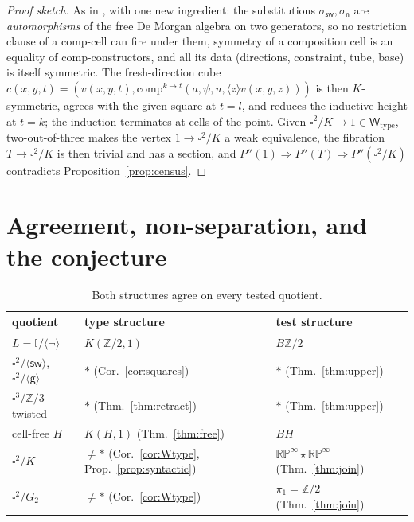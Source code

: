 \documentclass[11pt]{amsart}
\theoremstyle{definition}
\newcommand{\I}{\mathbb{I}}
\newcommand{\Wtype}{\mathsf{W}_{\mathrm{type}}}
\newcommand{\sw}{\mathsf{sw}}
\newcommand{\nb}{\mathsf{n}}
\newcommand{\gtw}{\mathsf{g}}
\newcommand{\Kl}{K}
\begin{document}
\begin{proof}[Proof sketch]
  As in \cite[Prop.~4.3]{PaperK}, with one new ingredient: the
  substitutions $\sigma_{\sw}, \sigma_{\nb}$ are
  \emph{automorphisms} of the free De Morgan algebra on two
  generators, so no restriction clause of a $\mathrm{comp}$-cell
  can fire under them, symmetry of a composition cell is an
  equality of $\mathrm{comp}$-constructors, and all its data
  (directions, constraint, tube, base) is itself symmetric.  The
  fresh-direction cube
  $c(x,y,t) = (v(x,y,t), \mathrm{comp}^{k \to t}(a, \psi, u,
  \langle z\rangle v(x,y,z)))$ is then $\Kl$-symmetric, agrees
  with the given square at $t = l$, and reduces the inductive
  height at $t = k$; the induction terminates at cells of the
  point.  Given $\square^2/\Kl \to 1 \in \Wtype$, two-out-of-three
  makes the vertex $1 \to \square^2/\Kl$ a weak equivalence, the
  fibration $T \to \square^2/\Kl$ is then trivial and has a
  section, and $P''(1) \Rightarrow P''(T) \Rightarrow
  P''(\square^2/\Kl)$ contradicts
  Proposition~\ref{prop:census}.
\end{proof}

\section{Agreement, non-separation, and the conjecture}
\label{sec:agree}

\begin{table}
  \centering
  \begin{tabular}{lll}
    \hline
    quotient & type structure & test structure \\
    \hline
    $L = \I/\langle\neg\rangle$
      & $K(\mathbb{Z}/2,1)$ \cite{PaperK}
      & $B\mathbb{Z}/2$ \cite{PaperL} \\
    $\square^2/\langle\sw\rangle$, $\square^2/\langle\gtw\rangle$
      & $\ast$ (Cor.~\ref{cor:squares})
      & $\ast$ (Thm.~\ref{thm:upper}) \\
    $\square^3/\mathbb{Z}/3$ twisted
      & $\ast$ (Thm.~\ref{thm:retract})
      & $\ast$ (Thm.~\ref{thm:upper}) \\
    cell-free $H$
      & $K(H,1)$ (Thm.~\ref{thm:free})
      & $BH$ \cite{PaperL} \\
    $\square^2/\Kl$
      & $\neq \ast$ (Cor.~\ref{cor:Wtype},
        Prop.~\ref{prop:syntactic})
      & $\mathbb{RP}^\infty \star \mathbb{RP}^\infty$
        (Thm.~\ref{thm:join}) \\
    $\square^2/G_2$
      & $\neq \ast$ (Cor.~\ref{cor:Wtype})
      & $\pi_1 = \mathbb{Z}/2$ (Thm.~\ref{thm:join}) \\
    \hline
  \end{tabular}
  \medskip
  \caption{Both structures agree on every tested quotient.}
  \label{tab:agree}
\end{table}
\end{document}
